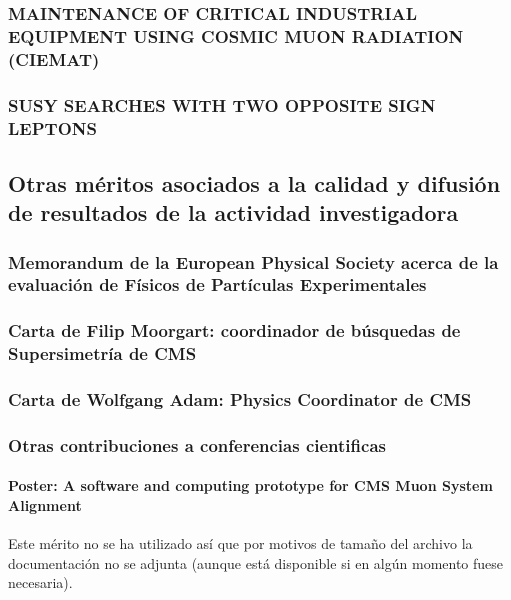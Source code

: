 \documentclass[a4paper, 11pt, twoside, openright]{report}
\begin{document}
\subsubsection{MAINTENANCE OF CRITICAL INDUSTRIAL EQUIPMENT USING COSMIC MUON RADIATION (CIEMAT)}


\subsubsection{SUSY SEARCHES WITH TWO OPPOSITE SIGN LEPTONS}



\subsection{Otras méritos asociados a la calidad y difusión de resultados de la actividad investigadora}

\subsubsection{Memorandum de la European Physical Society acerca de la evaluación de Físicos de Partículas Experimentales}


\subsubsection{Carta de Filip Moorgart: coordinador de búsquedas de Supersimetría de CMS}


\subsubsection{Carta de Wolfgang Adam: Physics Coordinator de CMS}



\subsubsection{Otras contribuciones a conferencias cientificas}


\paragraph{Poster: A software and computing prototype for CMS Muon System Alignment}
%
Este mérito no se ha utilizado así que por motivos de tamaño del archivo la documentación no se adjunta (aunque está disponible si en algún momento fuese necesaria).
\end{document}
